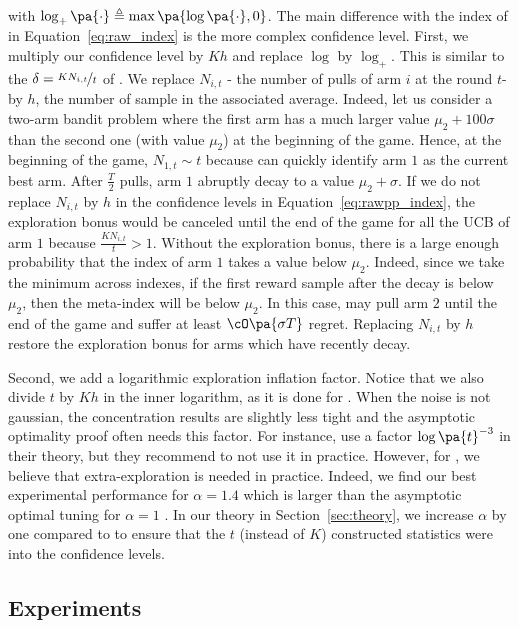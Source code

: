with $\log_+\pa{\cdot} \triangleq \max\pa{\log\pa{\cdot}, 0}$. The main difference with the index of \RAWUCB in Equation~\ref{eq:raw_index} is the more complex confidence level. First, we multiply our confidence level by $Kh$ and replace $\log$ by $\log_+$. This is similar to the $\delta = \nicefrac{KN_{i,t}}{t}$ of \MOSSa  \citep{degenne2016anytime}. We replace $N_{i,t}$ - the number of pulls of arm $i$ at the round $t$- by $h$, the number of sample in the associated average. Indeed, let us consider a two-arm bandit problem where the first arm has a much larger value $\mu_2 + 100 \sigma$ than the second one (with value $\mu_2$) at the beginning of the game. Hence, at the beginning of the game, $N_{1,t} \sim t$ because \RAWUCBpp can quickly identify arm $1$ as the current best arm. After $\frac{T}{2}$ pulls, arm $1$ abruptly decay to a value $\mu_2 + \sigma$. If we do not replace $N_{i,t}$ by $h$ in the confidence levels in Equation~\ref{eq:rawpp_index}, the exploration bonus would be canceled until the end of the game for all the UCB of arm $1$ because $\frac{KN_{i,t}}{t} > 1$. Without the exploration bonus, there is a large enough probability that the index of arm $1$ takes a value below $\mu_2$. Indeed, since we take the minimum across indexes, if the first reward sample after the decay is below $\mu_2$, then the meta-index will be below $\mu_2$. In this case, \RAWUCB may pull arm $2$ until the end of the game and suffer at least $\cO\pa{\sigma T}$ regret. Replacing $N_{i,t}$ by $h$ restore the exploration bonus for arms which have recently decay. 

Second, we add a logarithmic exploration inflation factor. Notice that we also divide $t$ by $Kh$ in the inner logarithm, as it is done for \KLUCBpp \citep{menard2017klucb++}. When the noise is not gaussian, the concentration results are slightly less tight and the asymptotic optimality proof often needs this factor. For instance, \citet{cappe2013klucb} use a factor $\log\pa{t}^{-3}$ in their theory, but they recommend to not use it in practice. However, for \RAWUCB, we believe that extra-exploration is needed in practice. Indeed, we find our best experimental performance for $\alpha=1.4$ which is larger than the asymptotic optimal tuning for \UCB $\alpha=1$ \citep{lattimore2020banditbook}. In our theory in Section~\ref{sec:theory}, we increase $\alpha$ by one compared to \UCBone to ensure that the $t$ (instead of $K$) constructed statistics were into the confidence levels. 




\subsection{Experiments}

